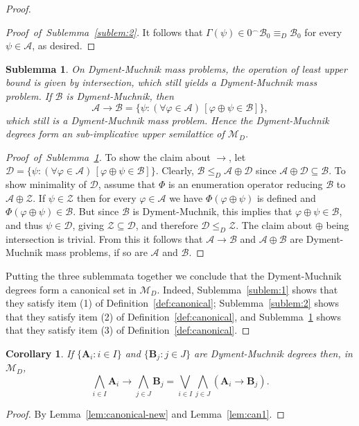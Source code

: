 \documentclass[11pt]{amsart}
\renewcommand{\phi}{\varphi}
\newtheorem{sublemma}{Sublemma}
\newtheorem{corollary}[theorem]{Corollary}
\newcommand{\smf}{\smallfrown}
\newcommand{\MP}[1]{\ensuremath{\mathcal{#1}}}
\newcommand{\QA}[1]{(\forall{#1})\,}
\begin{document}
\begin{proof}
\begin{proof}[Proof~of~Sublemma~\ref{sublem:2}]
It follows that $\Gamma(\psi) \in 0^\smf \MP{B}_0 \equiv_D \MP{B}_0$ for 
every $\psi \in \mathcal{A}$, as desired.    
\end{proof}

\begin{sublemma}\label{sublem:3}
On Dyment-Muchnik mass problems, the operation of least upper bound is given 
by intersection, which still yields a Dyment-Muchnik mass problem. If 
$\MP{B}$ is Dyment-Muchnik, then 
\[
\MP{A} \rightarrow \MP{B}= \{\psi:  \QA{\phi \in \mathcal{A}}[\phi \oplus 
\psi \in \mathcal{B}] \},
\]
which still is a Dyment-Muchnik mass problem. Hence the Dyment-Muchnik 
degrees form an sub-implicative upper semilattice of $\mathscr{M}_D$. 
\end{sublemma}

\begin{proof}[Proof~of~Sublemma~\ref{sublem:3}] 
To show the claim about $\rightarrow$, let $\mathcal{D}=\{\psi:  \QA{\phi \in 
\mathcal{A}}[\phi \oplus \psi \in \mathcal{B}]\}$. Clearly, 
$\mathcal{B}\leq_D \mathcal{A} \oplus \mathcal{D}$ since $\mathcal{A} \oplus 
\mathcal{D} \subseteq \mathcal{B}$. To show minimality of $\mathcal{D}$, 
assume that $\Phi$ is an enumeration operator reducing $\MP{B}$ to $\MP{A} \oplus 
\mathcal{Z}$. If $\psi \in \MP{Z}$ then for every $\phi \in 
\MP{A}$ we have $\Phi(\phi \oplus \psi)$ is defined and $\Phi(\phi \oplus 
\psi)\in \MP{B}$. But since $\MP{B}$ is Dyment-Muchnik, this implies that 
$\phi \oplus \psi\in \MP{B}$, and thus $\psi \in \MP{D}$, giving $\MP{Z} 
\subseteq \MP{D}$, and therefore $\MP{D} \leq_D \MP{Z}$. The claim about 
$\oplus$ being intersection is trivial. From this it follows that $\MP{A} 
\rightarrow \MP{B}$ and $\MP{A} \oplus \MP{B}$ are Dyment-Muchnik mass 
problems, if so are $\MP{A}$ and $\MP{B}$. 
\end{proof}

Putting the three sublemmata together we conclude that the Dyment-Muchnik 
degrees form a canonical set in $\mathscr{M}_D$. Indeed, 
Sublemma~\ref{sublem:1} shows that they satisfy item (1) of 
Definition~\ref{def:canonical}; Sublemma~\ref{sublem:2} shows that they 
satisfy item (2) of Definition~\ref{def:canonical}, and 
Sublemma~\ref{sublem:3} shows that they satisfy item (3) of 
Definition~\ref{def:canonical}. 
\end{proof}

\begin{corollary}\label{cor:free}
If $\{\mathbf{A}_i: i \in I\}$ and $\{\mathbf{B}_j: j \in J\}$ are 
Dyment-Muchnik degrees then, in $\mathscr{M}_D$, 
\[
\bigwedge_{i\in I} \mathbf{A}_i \rightarrow \bigwedge_{j \in J} \mathbf{B}_j =
      \bigvee_{i\in I}\bigwedge_{j \in J} (\mathbf{A}_i \rightarrow \mathbf{B}_j).
\] 
\end{corollary}
\begin{proof}
By Lemma~\ref{lem:canonical-new} and Lemma~\ref{lem:can1}.
\end{proof}
\end{document}
